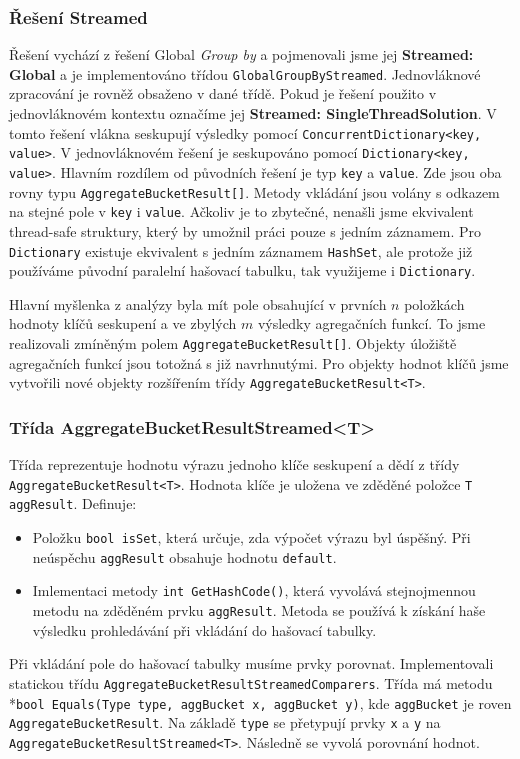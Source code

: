 \subsubsection{Řešení Streamed} \label{impl.improvement.groupby.streamed}

Řešení vychází z řešení Global \textit{Group by} a pojmenovali jsme jej \textbf{Streamed: Global} a je implementováno třídou \texttt{GlobalGroupByStreamed}.
Jednovláknové zpracování je rovněž obsaženo v dané třídě.
Pokud je řešení použito v jednovláknovém kontextu označíme jej \textbf{Streamed: SingleThreadSolution}.
V tomto řešení vlákna seskupují výsledky pomocí \texttt{ConcurrentDictionary<key, value>}.
V jednovláknovém řešení je seskupováno pomocí \texttt{Dictionary<key, value>}.
Hlavním rozdílem od původních řešení je typ \texttt{key} a \texttt{value}.
Zde jsou oba rovny typu \texttt{AggregateBucketResult[]}.
Metody vkládání jsou volány s odkazem na stejné pole v \texttt{key} i \texttt{value}.
Ačkoliv je to zbytečné, nenašli jsme ekvivalent thread-safe struktury, který by umožnil práci pouze s jedním záznamem.
Pro \texttt{Dictionary} existuje ekvivalent s jedním záznamem \texttt{HashSet}, ale protože již používáme původní paralelní hašovací tabulku, tak využijeme i \texttt{Dictionary}. 

Hlavní myšlenka z analýzy byla mít pole obsahující v prvních $n$ položkách hodnoty klíčů seskupení a ve zbylých $m$ výsledky agregačních funkcí.
To jsme realizovali zmíněným polem \texttt{AggregateBucketResult[]}.
Objekty úložiště agregačních funkcí jsou totožná s již navrhnutými.
Pro objekty hodnot klíčů jsme vytvořili nové objekty rozšířením třídy \texttt{AggregateBucketResult<T>}.

\subsubsection{Třída AggregateBucketResultStreamed<T>}

Třída reprezentuje hodnotu výrazu jednoho klíče seskupení a dědí z třídy \texttt{AggregateBucketResult<T>}.
Hodnota klíče je uložena ve zděděné položce \texttt{T aggResult}.
Definuje:
\begin{itemize}
\item Položku \texttt{bool isSet}, která určuje, zda výpočet výrazu byl úspěšný.
Při neúspěchu \texttt{aggResult} obsahuje hodnotu \texttt{default}. 
\item Imlementaci metody \texttt{int GetHashCode()}, která vyvolává stejnojmennou metodu na zděděném prvku \texttt{aggResult}.
Metoda se používá k získání haše výsledku prohledávání při vkládání do hašovací tabulky.
\end{itemize}
Při vkládání pole do hašovací tabulky musíme prvky porovnat. 
Implementovali statickou třídu \texttt{AggregateBucketResultStreamedComparers}.
Třída má metodu \\*\texttt{bool Equals(Type type, aggBucket x, aggBucket y)}, kde \texttt{aggBucket} je roven \texttt{AggregateBucketResult}.
Na základě \texttt{type} se přetypují prvky \texttt{x} a \texttt{y} na \texttt{AggregateBucketResultStreamed<T>}.
Následně se vyvolá porovnání hodnot.

